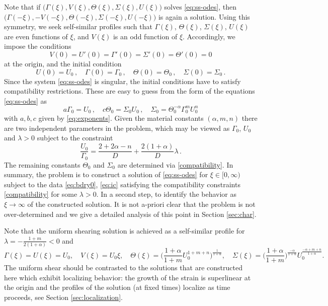 \documentclass[usletter,11pt]{article}
\theoremstyle{remark}
\begin{document}
Note that if $\big(\Gamma(\xi), V(\xi), \Theta(\xi), \Sigma(\xi), U(\xi)\big)$ solves \eqref{eq:ss-odes}, then 
$\big(\Gamma(-\xi), -V(-\xi), \Theta(-\xi), \Sigma(-\xi), U(-\xi)\big)$ is again a solution. 
Using this symmetry, we seek self-similar profiles such that $\Gamma(\xi)$, $\Theta(\xi)$, $\Sigma(\xi)$, $U(\xi)$ are even functions of $\xi$, and $V(\xi)$ is an odd function of $\xi$. Accordingly, we impose the conditions
\begin{equation}
 V(0)=U'(0)=\Gamma'(0)=\Sigma'(0)=\Theta'(0)=0 \label{eq:bdry0} 
\end{equation}
at the origin, and the initial condition 
\begin{equation}
\label{eq:ic}
U(0) = U_0 \, , \quad \Gamma (0) = \Gamma_0 \, , \quad \Theta (0) = \Theta_0 \, , \quad \Sigma (0) = \Sigma_0 \, .
\end{equation}
Since the system \eqref{eq:ss-odes} is singular, the initial conditions have to satisfy compatibility restrictions.
These are easy to guess from the form of the equations \eqref{eq:ss-odes} as
\begin{equation}
\label{compatibility}
a \Gamma_0 = U_0 \, , \quad 
c \Theta_0 = \Sigma_0 U_0 \, , \quad \Sigma_0 = \Theta_0^{-\alpha} \Gamma_0^m U_0^n
\end{equation}
with $a,b, c$ given by \eqref{eq:exponents}. Given the material constants $(\alpha, m, n)$ there are two independent parameters in the problem,
which may be viewed as $\Gamma_0$, $U_0$ and $\lambda > 0$ subject to the constraint
\begin{equation}
\label{rate}
\frac{U_0}{\Gamma_0} = \frac{2+2\alpha-n}{D} + \frac{2(1 + \alpha)}{D}\lambda \, .
\end{equation}
The remaining constants $\Theta_0$ and $\Sigma_0$ are determined via \eqref{compatibility}.
In summary, the problem is to construct a solution of \eqref{eq:ss-odes} for $\xi \in [0,\infty)$ subject to the data \eqref{eq:bdry0}, \eqref{eq:ic} satisfying the compatibility constraints \eqref{compatibility}
for some $\lambda > 0$. In a second step, to identify the behavior as $\xi \to \infty$ of the constructed solution.
It is not a-priori clear that the problem is not over-determined 
and we give a detailed analysis of this point  in Section \ref{sec:char}.





Note that the uniform shearing solution is achieved as a self-similar profile for  $\lambda = -\frac{1+m}{2(1+\alpha)}<0$ and
\begin{equation*}
 \Gamma(\xi) = U(\xi)=U_0, \quad V(\xi) = U_0\xi, \quad  \Theta(\xi) = \Big( \frac{1+\alpha}{1+m} U_0^{1+m+n}\Big)^{\frac{1}{1+\alpha}}, \quad \Sigma(\xi) = \Big(\frac{1+\alpha}{1+m}\Big)^{\frac{-\alpha}{1+\alpha}} U_0^{\frac{-\alpha+m+n}{1+\alpha}}.
\end{equation*}
The uniform shear should be contrasted to the solutions that are constructed here which exhibit localizing behavior:
the growth of the strain is superlinear at  the origin and the profiles of the solution (at fixed times) localize  as time proceeds, see Section \ref{sec:localization}.
\end{document}
